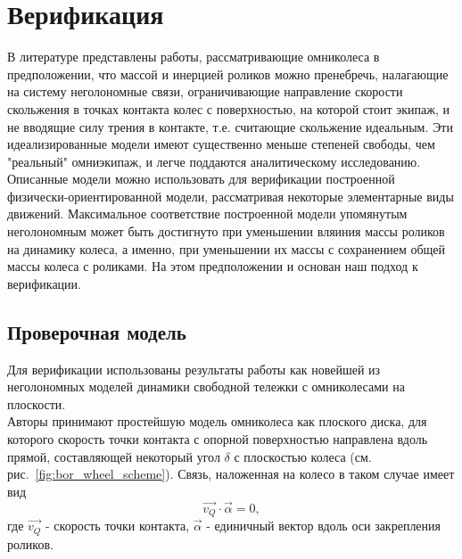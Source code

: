 \section{Верификация}
В литературе представлены \cite{Borisov2011, formalskii, ZobovaTatarinovPMM} работы, рассматривающие омниколеса в предположении, что массой и инерцией роликов можно пренебречь, налагающие на систему неголономные связи, ограничивающие направление скорости скольжения в точках контакта колес с поверхностью, на которой стоит экипаж, и не вводящие силу трения в контакте, т.е. считающие скольжение идеальным. Эти идеализированные модели имеют существенно меньше степеней свободы, чем "реальный" омниэкипаж, и легче поддаются аналитическому исследованию.\\

Описанные модели можно использовать для верификации построенной физически-ориентированной модели, рассматривая некоторые элементарные виды движений. Максимальное соответствие построенной модели упомянутым неголономным может быть достигнуто при уменьшении вляиния массы роликов на динамику колеса, а именно, при уменьшении их массы с сохранением общей массы колеса с роликами. На этом предположении и основан наш подход к верификации.\\

\subsection{Проверочная модель}

Для верификации использованы результаты работы \cite{Borisov2011} как новейшей из неголономных моделей динамики свободной тележки с омниколесами на плоскости.\\

Авторы \cite{Borisov2011} принимают простейшую модель омниколеса как плоского диска, для которого скорость точки контакта с опорной поверхностью направлена вдоль прямой, составляющей некоторый угол $\delta$ с плоскостью колеса (см. рис.~\ref{fig:bor_wheel_scheme}). Связь, наложенная на колесо в таком случае имеет вид
$$\vec{v_Q}\cdot\vec{\alpha} = 0,$$
где $\vec{v_Q}$ - скорость точки контакта, $\vec{\alpha}$ - единичный вектор вдоль оси закрепления роликов.\\


